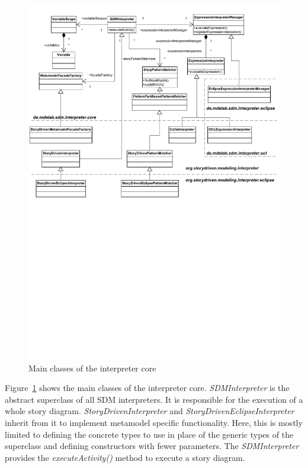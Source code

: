 \begin{figure}[htb]
  \centering
  \includegraphics[width=1.0\columnwidth]{./figures/interpreter_core.pdf}
  \caption{Main classes of the interpreter core}
  \label{fig:sdm_interpreter}
\end{figure}

Figure~\ref{fig:sdm_interpreter} shows the main classes of the interpreter core. 
\emph{SDMInterpreter} is the abstract superclass of all SDM interpreters. 
It is responsible for the execution of a whole story diagram. 
\emph{StoryDrivenInterpreter} and \emph{StoryDrivenEclipseInterpreter} inherit from it to implement metamodel specific functionality. 
Here, this is mostly limited to defining the concrete types to use in place of the generic types of the superclass and defining constructors with fewer parameters. 
The \emph{SDMInterpreter} provides the \emph{executeActivity()} method to execute a story diagram.


